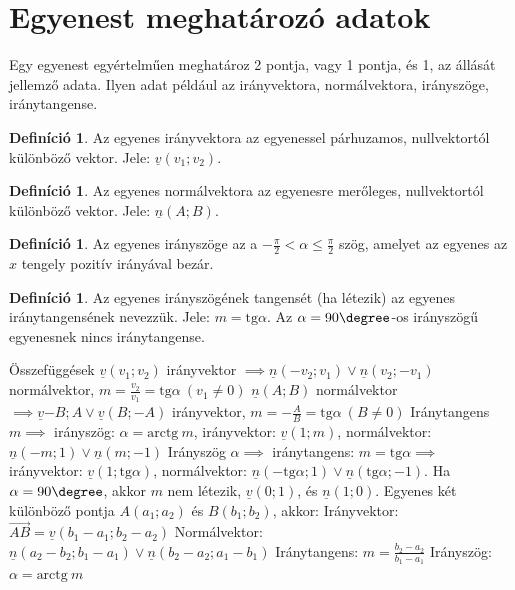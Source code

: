 \documentclass[twoside,12pt]{report}
\renewcommand{\vec}{\underline}
\theoremstyle{definition}
\newtheorem{definition}[theorem]{Definíció}
\begin{document}
\section{Egyenest meghatározó adatok}
	Egy egyenest egyértelműen meghatároz 2 pontja, vagy 1 pontja, és 1, az állását jellemző adata. Ilyen adat például az irányvektora, normálvektora, irányszöge, iránytangense.
	\begin{definition}
		Az egyenes irányvektora az egyenessel párhuzamos, nullvektortól különböző vektor. Jele: $\vec{v}(v_1;v_2)$.
	\end{definition}
	\begin{definition}
		Az egyenes normálvektora az egyenesre merőleges, nullvektortól különböző vektor. Jele: $\vec{n}(A;B)$.
	\end{definition}
	\begin{definition}
		Az egyenes irányszöge az a $-\frac{\pi}{2}<\alpha\le\frac{\pi}{2}$ szög, amelyet az egyenes az $x$ tengely pozitív irányával bezár.
	\end{definition}
	\begin{definition}
		Az egyenes irányszögének tangensét (ha létezik) az egyenes iránytangensének nevezzük. Jele: $m=\text{tg}\alpha$. Az $\alpha=90\degree$-os irányszögű egyenesnek nincs iránytangense.
	\end{definition}
	\begin{outline}
		\1 Összefüggések
			\2 $\vec{v}(v_1;v_2)$ irányvektor $\implies \vec{n}(-v_2;v_1)\vee\vec{n}(v_2;-v_1)$ normálvektor, $m=\frac{v_2}{v_1}=\text{tg}\alpha\ (v_1\ne0)$
			\2 $\vec{n}(A;B)$ normálvektor $\implies\vec{v}{-B;A}\vee\vec{v}(B;-A)$ irányvektor, $m=-\frac{A}{B}=\text{tg}\alpha\ (B\ne0)$
			\2 Iránytangens $m\implies$ irányszög: $\alpha=\text{arctg}\ m$, irányvektor: $\vec{v}(1;m)$, normálvektor: $\vec{n}(-m;1)\vee\vec{n}(m;-1)$
			\2 Irányszög $\alpha\implies$ iránytangens: $m=\text{tg}\alpha\implies$ irányvektor: $\vec{v}(1;\text{tg}\alpha)$, normálvektor: $\vec{n}(-\text{tg}\alpha;1)\vee\vec{n}(\text{tg}\alpha;-1)$. Ha $\alpha=90\degree$, akkor $m$ nem létezik, $\vec{v}(0;1)$, és $\vec{n}(1;0)$.
			\2 Egyenes két különböző pontja $A(a_1;a_2)$ és $B(b_1;b_2)$, akkor:
				\3 Irányvektor: $\overrightarrow{AB}=\vec{v}(b_1-a_1;b_2-a_2)$
				\3 Normálvektor: $\vec{n}(a_2-b_2;b_1-a_1)\vee\vec{n}(b_2-a_2;a_1-b_1)$
				\3 Iránytangens: $m=\frac{b_2-a_2}{b_1-a_1}$
				\3 Irányszög: $\alpha=\text{arctg}\ m$
	\end{outline}
\end{document}
